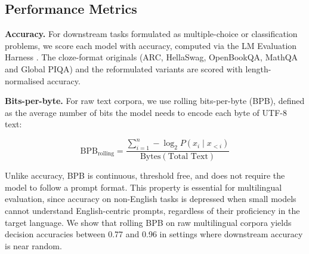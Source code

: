 \subsection{Performance Metrics}

\textbf{Accuracy.} For downstream tasks formulated as multiple-choice or classification problems, we score each model with accuracy, computed via the LM Evaluation Harness \cite{eval-harness}. The cloze-format originals (ARC, HellaSwag, OpenBookQA, MathQA and Global PIQA) and the reformulated variants are scored with length-normalised accuracy.

\textbf{Bits-per-byte.} For raw text corpora, we use rolling bits-per-byte (BPB), defined as the average number of bits the model needs to encode each byte of UTF-8 text:

$$\text{BPB}_{\text{rolling}} = \frac{\sum_{i=1}^{n} -\log_2 P(x_i \mid x_{<i})}{\text{Bytes}(\text{Total Text})}$$

Unlike accuracy, BPB is continuous, threshold free, and does not require the model to follow a prompt format. This property is essential for multilingual evaluation, since accuracy on non-English tasks is depressed when small models cannot understand English-centric prompts, regardless of their proficiency in the target language. We show that rolling BPB on raw multilingual corpora yields decision accuracies between 0.77 and 0.96 in settings where downstream accuracy is near random.


